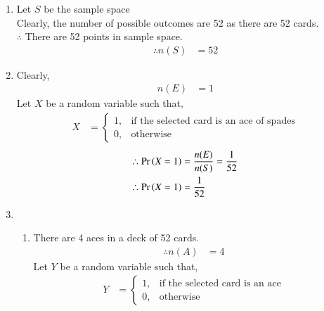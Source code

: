\documentclass[journal,12pt,twocolumn]{IEEEtran}
\begin{document}
\begin{enumerate}[label=(\alph*)]
	\item
		Let $S$ be the sample space\\
		Clearly, the number of possible outcomes are 52 as there are 52 cards.\\
		$\therefore$ There are 52 points in sample space.
		\begin{align} 
			\therefore n(S) &= 52
		\end{align}
        	\begin{table}[H]
		\centering
                
                \label{tab: Table 1}
                \end{table}

	\item
		Clearly, \begin{align}
			n(E) &= 1
			\end{align}
		Let $X$ be a random variable such that, 
		\begin{align}
			X &= 
			\begin{cases}
				1, & \text{if the selected card is an ace of spades}\\
				0, & \text{otherwise}
			\end{cases}
		\end{align}
		\begin{align}
			\therefore \Pr\left(X=1\right) &= \frac{n(E)}{n(S)} 
					  = \frac{1}{52}\\	
			\therefore \Pr\left(X=1\right) &= \frac{1}{52}
		\end{align}			
	\item
		\begin{enumerate}[label=\roman*)]
			\item		
				There are 4 aces in a deck of 52 cards.
				\begin{align}
					\therefore n(A) &= 4
				\end{align}
				Let $Y$ be a random variable such that,
				\begin{align}
					Y &=
					\begin{cases}
						1, & \text{if the selected card is an ace}\\
						0, & \text{otherwise}
					\end{cases}
				\end{align}


\end{enumerate}
\end{enumerate}
\end{document}
